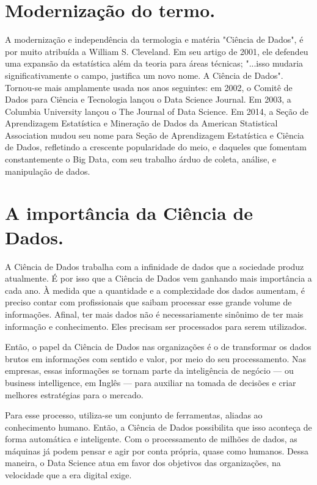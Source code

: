 \documentclass[12pt]{article}
\begin{document}
\section{Modernização do termo.}

A modernização e independência da termologia e matéria "Ciência de Dados", é por muito atribuída a William S. Cleveland. Em seu artigo de 2001, ele defendeu uma expansão da estatística além da teoria para áreas técnicas; "...isso mudaria significativamente o campo, justifica um novo nome. A Ciência de Dados". Tornou-se mais amplamente usada nos anos seguintes: em 2002, o Comitê de Dados para Ciência e Tecnologia lançou o Data Science Journal. Em 2003, a Columbia University lançou o The Journal of Data Science. Em 2014, a Seção de Aprendizagem Estatística e Mineração de Dados da American Statistical Association mudou seu nome para Seção de Aprendizagem Estatística e Ciência de Dados, refletindo a crescente popularidade do meio, e daqueles que fomentam constantemente o Big Data, com seu trabalho árduo de coleta, análise, e manipulação de dados. 

\section{A importância da Ciência de Dados.}

A Ciência de Dados trabalha com a infinidade de dados que a sociedade produz atualmente. É por isso que a Ciência de Dados vem ganhando mais importância a cada ano. À medida que a quantidade e a complexidade dos dados aumentam, é preciso contar com profissionais que saibam processar esse grande volume de informações. Afinal, ter mais dados não é necessariamente sinônimo de ter mais informação e conhecimento. Eles precisam ser processados para serem utilizados.

Então, o papel da Ciência de Dados nas organizações é o de transformar os dados brutos em informações com sentido e valor, por meio do seu processamento. Nas empresas, essas informações se tornam parte da inteligência de negócio — ou business intelligence, em Inglês — para auxiliar na tomada de decisões e criar melhores estratégias para o mercado.

Para esse processo, utiliza-se um conjunto de ferramentas, aliadas ao conhecimento humano. Então, a Ciência de Dados possibilita que isso aconteça de forma automática e inteligente. Com o processamento de milhões de dados, as máquinas já podem pensar e agir por conta própria, quase como humanos. Dessa maneira, o Data Science atua em favor dos objetivos das organizações, na velocidade que a era digital exige.
\end{document}
